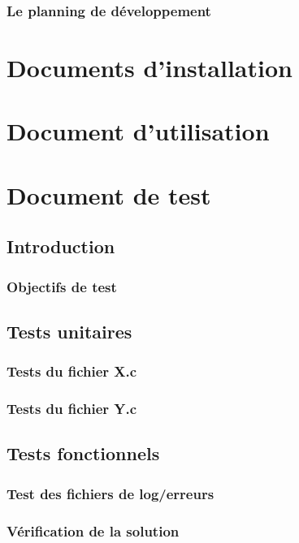 \documentclass{polytech/polytech}
\begin{document}
        \subsection{Le planning de développement}
    
    \chapter{Documents d'installation}
    
    \chapter{Document d'utilisation}
    
    \chapter{Document de test}
    
        \section{Introduction}
            \subsection{Objectifs de test}
        
        \section{Tests unitaires}
            \subsection{Tests du fichier X.c}
            \subsection{Tests du fichier Y.c}
        
        \section{Tests fonctionnels}
            \subsection{Test des fichiers de log/erreurs}
            \subsection{Vérification de la solution}
        
\end{document}
